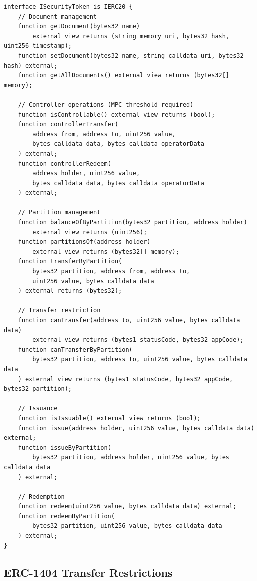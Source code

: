 \documentclass[11pt,a4paper]{article}
\begin{document}
\begin{lstlisting}[language=Solidity,caption={Core security token interface.}]
interface ISecurityToken is IERC20 {
    // Document management
    function getDocument(bytes32 name)
        external view returns (string memory uri, bytes32 hash, uint256 timestamp);
    function setDocument(bytes32 name, string calldata uri, bytes32 hash) external;
    function getAllDocuments() external view returns (bytes32[] memory);

    // Controller operations (MPC threshold required)
    function isControllable() external view returns (bool);
    function controllerTransfer(
        address from, address to, uint256 value,
        bytes calldata data, bytes calldata operatorData
    ) external;
    function controllerRedeem(
        address holder, uint256 value,
        bytes calldata data, bytes calldata operatorData
    ) external;

    // Partition management
    function balanceOfByPartition(bytes32 partition, address holder)
        external view returns (uint256);
    function partitionsOf(address holder)
        external view returns (bytes32[] memory);
    function transferByPartition(
        bytes32 partition, address from, address to,
        uint256 value, bytes calldata data
    ) external returns (bytes32);

    // Transfer restriction
    function canTransfer(address to, uint256 value, bytes calldata data)
        external view returns (bytes1 statusCode, bytes32 appCode);
    function canTransferByPartition(
        bytes32 partition, address to, uint256 value, bytes calldata data
    ) external view returns (bytes1 statusCode, bytes32 appCode, bytes32 partition);

    // Issuance
    function isIssuable() external view returns (bool);
    function issue(address holder, uint256 value, bytes calldata data) external;
    function issueByPartition(
        bytes32 partition, address holder, uint256 value, bytes calldata data
    ) external;

    // Redemption
    function redeem(uint256 value, bytes calldata data) external;
    function redeemByPartition(
        bytes32 partition, uint256 value, bytes calldata data
    ) external;
}
\end{lstlisting}

\subsection{ERC-1404 Transfer Restrictions}
\end{document}
